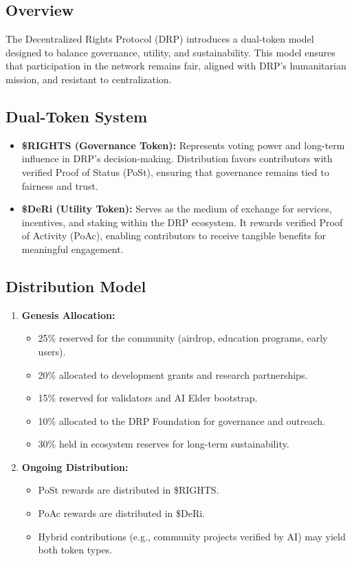 \documentclass[11pt,a4paper]{article}
\begin{document}
\subsection{Overview}
The Decentralized Rights Protocol (DRP) introduces a dual-token model designed to balance governance, utility, and sustainability. This model ensures that participation in the network remains fair, aligned with DRP’s humanitarian mission, and resistant to centralization.

\subsection{Dual-Token System}
\begin{itemize}
    \item \textbf{\$RIGHTS (Governance Token):} Represents voting power and long-term influence in DRP’s decision-making. Distribution favors contributors with verified Proof of Status (PoSt), ensuring that governance remains tied to fairness and trust.
    \item \textbf{\$DeRi (Utility Token):} Serves as the medium of exchange for services, incentives, and staking within the DRP ecosystem. It rewards verified Proof of Activity (PoAc), enabling contributors to receive tangible benefits for meaningful engagement.
\end{itemize}

\subsection{Distribution Model}
\begin{enumerate}
    \item \textbf{Genesis Allocation:}
    \begin{itemize}
        \item 25\% reserved for the community (airdrop, education programs, early users).
        \item 20\% allocated to development grants and research partnerships.
        \item 15\% reserved for validators and AI Elder bootstrap.
        \item 10\% allocated to the DRP Foundation for governance and outreach.
        \item 30\% held in ecosystem reserves for long-term sustainability.
    \end{itemize}
    
    \item \textbf{Ongoing Distribution:}
    \begin{itemize}
        \item PoSt rewards are distributed in \$RIGHTS.
        \item PoAc rewards are distributed in \$DeRi.
        \item Hybrid contributions (e.g., community projects verified by AI) may yield both token types.
    \end{itemize}
\end{enumerate}
\end{document}
